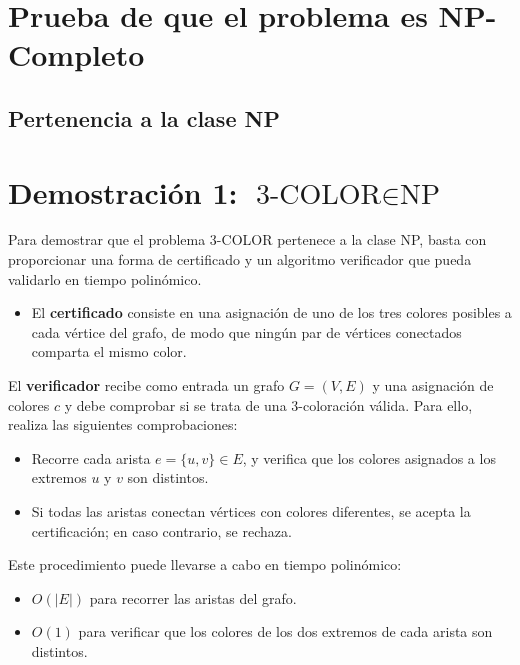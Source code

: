\documentclass[a4paper,12pt]{article}
\begin{document}
\section{Prueba de que el problema es NP-Completo}

\subsection{Pertenencia a la clase NP}


\section*{Demostración 1: \( \text{3-COLOR} \in \text{NP} \)}

Para demostrar que el problema 3-COLOR pertenece a la clase NP, basta con proporcionar una forma de certificado y un algoritmo verificador que pueda validarlo en tiempo polinómico.

\begin{itemize}
    \item El \textbf{certificado} consiste en una asignación de uno de los tres colores posibles a cada vértice del grafo, de modo que ningún par de vértices conectados comparta el mismo color.
\end{itemize}

El \textbf{verificador} recibe como entrada un grafo \( G = (V, E) \) y una asignación de colores \( c \) y debe comprobar si se trata de una 3-coloración válida. Para ello, realiza las siguientes comprobaciones:

\begin{itemize}
    \item Recorre cada arista \( e = \{u, v\} \in E \), y verifica que los colores asignados a los extremos \( u \) y \( v \) son distintos.
    \item Si todas las aristas conectan vértices con colores diferentes, se acepta la certificación; en caso contrario, se rechaza.
\end{itemize}

Este procedimiento puede llevarse a cabo en tiempo polinómico:

\begin{itemize}[label=--]
    \item \( O(|E|) \) para recorrer las aristas del grafo.
    \item \( O(1) \) para verificar que los colores de los dos extremos de cada arista son distintos.
\end{itemize}
\end{document}
